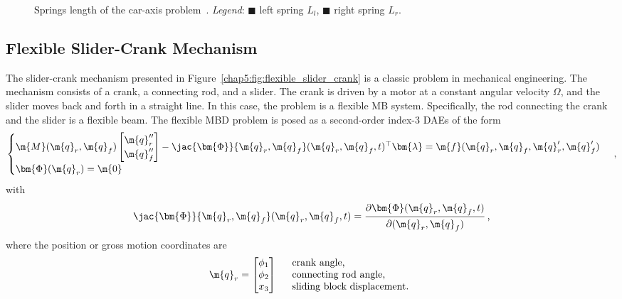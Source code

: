 \begin{figure}[htb]
  \centering
  \small{}
  \caption{Springs length of the car-axis problem~\cite{lioen1998test, mazzia2008test}. \emph{Legend}: \textcolor{mycolor1}{$\blacksquare$} left spring $L_l$, \textcolor{mycolor2}{$\blacksquare$} right spring $L_r$.}
  \label{chap5:fig:tppc_initial}
\end{figure}

\subsection{Flexible Slider-Crank Mechanism}

The slider-crank mechanism presented in Figure~\ref{chap5:fig:flexible_slider_crank} is a classic problem in mechanical engineering. The mechanism consists of a crank, a connecting rod, and a slider. The crank is driven by a motor at a constant angular velocity $\Omega$, and the slider moves back and forth in a straight line. In this case, the problem is a flexible \ac{MB} system. Specifically, the rod connecting the crank and the slider is a flexible beam. The flexible \ac{MBD} problem is posed as a second-order index-3 \acp{DAE} of the form
%
\begin{equation*}
  \begin{cases}
    \m{M}(\m{q}_{r}, \m{q}_{f}^{\phantom{\prime}})\begin{bmatrix}\m{q}_{r}^{\prime\prime} \\ \m{q}_{f}^{\prime\prime}\end{bmatrix} - \jac{\bm{\Phi}}{\m{q}_{r},\m{q}_{f}}(\m{q}_{r}, \m{q}_{f}^{\phantom{\prime}}, t)^{\top}\bm{\lambda} = \m{f}(\m{q}_{r}, \m{q}_{f}^{\phantom{\prime}}, \m{q}_{r}^{\prime}, \m{q}_{f}^{\prime}) \\
    \bm{\Phi}(\m{q}_{r}) = \m{0}
  \end{cases} \, \text{,}
\end{equation*}
%
with
%
\begin{equation*}
  \jac{\bm{\Phi}}{\m{q}_{r},\m{q}_{f}}(\m{q}_{r}, \m{q}_{f}^{\phantom{\prime}}, t) = \dfrac{\partial\bm{\Phi}(\m{q}_{r}, \m{q}_{f}^{\phantom{\prime}}, t)}{\partial(\m{q}_{r}, \m{q}_{f}^{\phantom{\prime}})} \, \text{,}
\end{equation*}
%
where the position or gross motion coordinates are
%
\begin{equation*}
  \m{q}_{r} = \begin{bmatrix}
    \phi_1 \\
    \phi_2 \\
    x_3
  \end{bmatrix} \quad \begin{array}{l}
    \text{crank angle,} \\
    \text{connecting rod angle,} \\
    \text{sliding block displacement.}
  \end{array}
\end{equation*}
